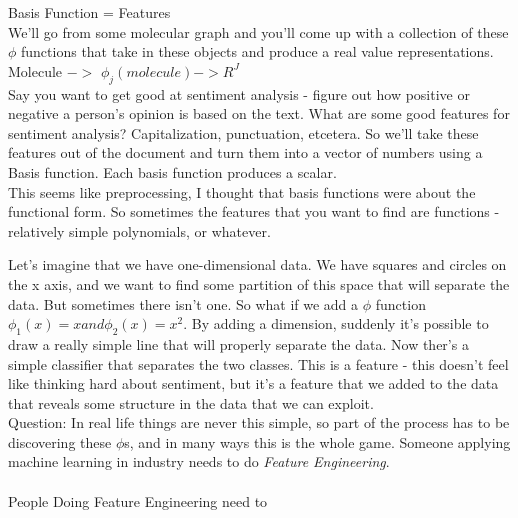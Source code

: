 \documentclass[12pt]{article}   	%
\begin{document}
Basis Function = Features\\

We'll go from some molecular graph and you'll come up with a collection of these $\phi$ functions that take in these objects and produce a real value representations. \\

Molecule $->$ $\phi _{j}(molecule)$$ -> $$R^{J}$\\

\noindent
Say you want to get good at sentiment analysis - figure out how positive or negative a person's opinion is based on the text. What are some good features for sentiment analysis? Capitalization, punctuation, etcetera. So we'll take these features out of the document and turn them into a vector of numbers using a Basis function. Each basis function produces a scalar.\\

\noindent
This seems like preprocessing, I thought that basis functions were about the functional form. So sometimes the features that you want to find are functions - relatively simple polynomials, or whatever.

\noindent
Let's imagine that we have one-dimensional data. We have squares and circles on the x axis, and we want to find some partition of this space that will separate the data. But sometimes there isn't one. So what if we add a $\phi$ function $\phi _{1}(x) = x and \phi _{2}(x) = x^{2}$. By adding a dimension, suddenly it's possible to draw a really simple line that will properly separate the data. Now ther's a simple classifier that separates the two classes. This is a feature - this doesn't feel like thinking hard about sentiment, but it's a feature that we added to the data that reveals some structure in the data that we can exploit.\\

Question: In real life things are never this simple, so part of the process has to be discovering these $\phi$s, and in many ways this is the whole game. Someone applying machine learning in industry needs to do \textit{Feature Engineering}. \\\\

People Doing Feature Engineering need to 
\end{document}
